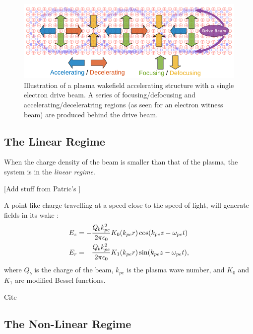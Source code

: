 \begin{figure}[hbt]
    \centering
    \includegraphics[width=0.85\linewidth,trim={0mm 0mm 0mm 0mm},clip]{figures/PlasmaWakefield}
    \caption{\label{Fig:PWFA:Illust} Illustration of a plasma wakefield accelerating structure with a single electron drive beam. A series of focusing/defocusing and accelerating/deceleratring regions (as seen for an electron witness beam) are produced behind the drive beam.}
\end{figure}

\subsection{The Linear Regime}
\label{Int:BPI:Lin}

When the charge density of the beam is smaller than that of the plasma, the system is in the \textit{linear regime}. 

[Add stuff from Patric's \cite{muggli:2017}]

A point like charge travelling at a speed close to the speed of light, will generate fields in its wake \cite{van_der_meer:1985, chen:1985}:
\begin{align}
    E_{z} &= -\frac{Q_{b}k_{pe}^{2}}{2\pi\epsilon_{0}} K_{0}(k_{pe}r)\cos(k_{pe}z - \omega_{pe}t) \label{EQ:PWFA:EZ} \\
    E_{r} &= \hphantom{-} \frac{Q_{b}k_{pe}^{2}}{2\pi\epsilon_{0}} K_{1}(k_{pe}r)\sin(k_{pe}z - \omega_{pe}t), \label{EQ:PWFA:ER}
\end{align}
where $Q_{b}$ is the charge of the beam, $k_{pe}$ is the plasma wave number, and $K_{0}$ and $K_{1}$ are modified Bessel functions. 

Cite \cite{ruth:1985}

\subsection{The Non-Linear Regime}
\label{Int:BPI:NLin}

